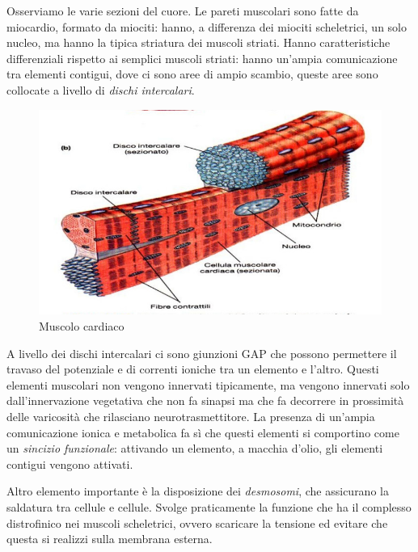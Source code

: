 \documentclass[a4paper,12pt]{article}
\begin{document}
Osserviamo le varie sezioni del cuore. Le pareti muscolari sono fatte da miocardio, formato da miociti: hanno, a differenza dei miociti scheletrici, un solo nucleo, ma hanno la tipica striatura dei muscoli striati.
Hanno caratteristiche differenziali rispetto ai semplici muscoli striati: hanno un'ampia comunicazione tra elementi contigui, dove ci sono aree di ampio scambio, queste aree sono collocate a livello di \emph{dischi intercalari}.
\begin{figure}[H]
\centering
\includegraphics[scale=0.35]{immagine/miociti.jpg}
\caption{Muscolo cardiaco}
\end{figure} 
A livello dei dischi intercalari ci sono giunzioni GAP che possono permettere il travaso del potenziale e di correnti ioniche tra un elemento e l'altro. Questi elementi muscolari non vengono innervati tipicamente, ma vengono innervati solo dall'innervazione vegetativa che non fa sinapsi ma che fa decorrere in prossimità delle varicosità che rilasciano neurotrasmettitore. La presenza di un'ampia comunicazione ionica e metabolica fa sì che questi elementi si comportino come un \emph{sincizio funzionale}: attivando un elemento, a macchia d'olio, gli elementi contigui vengono attivati.

Altro elemento importante è la disposizione dei \emph{desmosomi}, che assicurano la saldatura tra cellule e cellule. Svolge praticamente la funzione che ha il complesso distrofinico nei muscoli scheletrici, ovvero scaricare la tensione ed evitare che questa si realizzi sulla membrana esterna.
\end{document}

